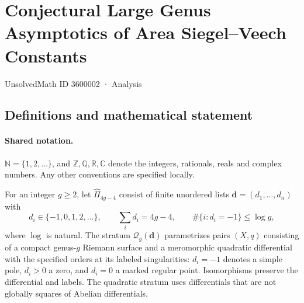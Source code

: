 \documentclass[11pt]{article}
\begin{document}
\setcounter{section}{3600001}
\section{Conjectural Large Genus Asymptotics of Area Siegel–Veech Constants}\label{3600002}
{\small\sffamily UnsolvedMath ID 3600002 · Analysis}
\subsection{Definitions and mathematical statement}

\paragraph{Shared notation.}$\mathbb N=\{1,2,\ldots\}$, and $\mathbb Z,\mathbb Q,\mathbb R,\mathbb C$ denote the integers, rationals, reals and complex numbers. Any other conventions are specified locally.


For an integer $g\ge2$, let $\widehat\Pi_{4g-4}$ consist of finite unordered lists $\boldsymbol d=(d_1,\ldots,d_n)$ with
\[
 d_i\in\{-1,0,1,2,\ldots\},\qquad\sum_i d_i=4g-4,\qquad
 \#\{i:d_i=-1\}\le\log g,
\]
where $\log$ is natural. The stratum $\mathcal Q_g(\boldsymbol d)$ parametrizes pairs $(X,q)$ consisting of a compact genus-$g$ Riemann surface and a meromorphic quadratic differential with the specified orders at its labeled singularities: $d_i=-1$ denotes a simple pole, $d_i>0$ a zero, and $d_i=0$ a marked regular point. Isomorphisms preserve the differential and labels. The quadratic stratum uses differentials that are not globally squares of Abelian differentials.
\end{document}
